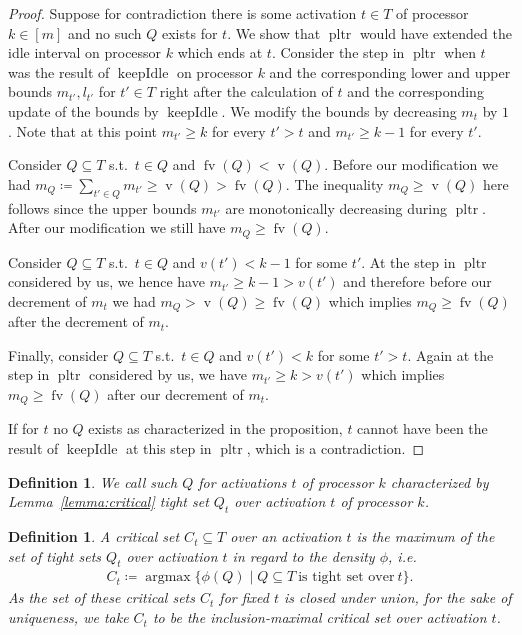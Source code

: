 \documentclass[a4paper]{article}
\DeclareMathOperator{\argmax}{argmax}
\DeclareMathOperator{\pltr}{pltr}
\DeclareMathOperator{\fv}{fv}
\DeclareMathOperator{\vol}{v}
\DeclareMathOperator{\keepidle}{keepIdle}
\newtheorem{definition}[theorem]{Definition}
\begin{document}
\begin{proof}
  Suppose for contradiction there is some activation $t \in T$ of processor $k \in [m]$ and no such $Q$ exists for $t$.
  We show that $\pltr$ would have extended the idle interval on processor $k$ which ends at $t$.
  Consider the step in $\pltr$ when $t$ was the result of $\keepidle$ on processor $k$ and the corresponding lower and upper bounds $m_{t'}, l_{t'}$ for $t' \in T$ right after the calculation of $t$ and the corresponding update of the bounds by $\keepidle$.
  We modify the bounds by decreasing $m_t$ by $1$.
  Note that at this point $m_{t'} \geq k$ for every $t' > t$ and $m_{t'} \geq k - 1$ for every $t'$.

  Consider $Q \subseteq T$ s.t.\ $t \in Q$ and $\fv(Q) < \vol(Q)$.
  Before our modification we had $m_Q \coloneqq \sum_{t' \in Q} m_{t'} \geq \vol(Q) > \fv(Q)$.
  The inequality $m_Q \geq \vol(Q)$ here follows since the upper bounds $m_{t'}$ are monotonically decreasing during $\pltr$.
  After our modification we still have $m_Q \geq \fv(Q)$.

  Consider $Q \subseteq T$ s.t.\ $t \in Q$ and $v(t') < k - 1$ for some $t'$.
  At the step in $\pltr$ considered by us, we hence have $m_{t'} \geq k - 1 > v(t')$ and therefore before our decrement of $m_t$ we had $m_Q > \vol(Q) \geq \fv(Q)$ which implies $m_Q \geq \fv(Q)$ after the decrement of $m_t$.

  Finally, consider $Q \subseteq T$ s.t.\ $t \in Q$ and $v(t') < k$ for some $t' > t$.
  Again at the step in $\pltr$ considered by us, we have $m_{t'} \geq k > v(t')$ which implies $m_Q \geq \fv(Q)$ after our decrement of $m_t$.

  If for $t$ no $Q$ exists as characterized in the proposition, $t$ cannot have been the result of $\keepidle$ at this step in $\pltr$, which is a contradiction.
\end{proof}

\begin{definition}
  We call such $Q$ for activations $t$ of processor $k$ characterized by Lemma~\ref{lemma:critical} \emph{tight set $Q_t$ over activation $t$ of processor $k$}.
\end{definition}

\begin{definition}
  A \emph{critical set $C_t \subseteq T$ over an activation $t$} is the maximum of the set of tight sets $Q_t$ over activation $t$ in regard to the density $\phi$, i.e.
  \begin{align}
    C_t \coloneqq \argmax \{ \phi(Q) \mid Q \subseteq T~\text{is tight set over}~t \} \text{.}
  \end{align}
  As the set of these critical sets $C_t$ for fixed $t$ is closed under union, for the sake of uniqueness, we take $C_t$ to be the inclusion-maximal critical set over activation $t$.
\end{definition}
\end{document}
